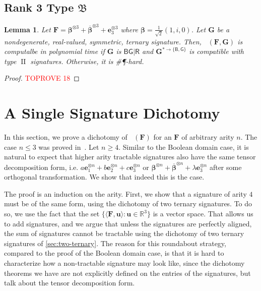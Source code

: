 \documentclass[11pt]{article}
\newtheorem{lemma}[theorem]{Lemma}
\DeclareMathOperator{\holts}{Holant^*_3}
\DeclareMathOperator{\typeii}{II}
\newcommand{\db}{\mathsf{B}}
\newcommand{\dg}{\mathsf{G}}
\newcommand{\dr}{\mathsf{R}}
\newcommand{\sph}{\#\P-hard\xspace}
\newcommand{\teh}{^{\otimes 3}}
\newcommand{\domres}[1]{
  ^{*\to\{#1\}}
}
\newcommand{\ternarytractz}{$\mathfrak{B}$\xspace}
\begin{document}
\subsection{Rank 3 Type \texorpdfstring{\ternarytractz}{B}}
\begin{lemma}\label{lem:dichotomy-terneray-ternary-rank-3-z}
  Let $\mathbf{F} = \boldsymbol{\beta} \teh + \overline{\boldsymbol{\beta}} \teh + \mathbf{e}_3 \teh$ where $\boldsymbol{\beta} = \frac{1}{\sqrt{2}} (1, i, 0)$.
  Let $\mathbf{G}$ be a nondegenerate, real-valued, symmetric, ternary signature.
  Then, $\holts(\mathbf{F}, \mathbf{G})$ is computalbe in polynomial time if $\mathbf{G}$ is $\db \dg | \dr$ and $\mathbf{G}\domres{\db, \dg}$ is compatible with type $\typeii$ signatures.
  Otherwise, it is \sph.
\end{lemma}
\begin{proof}\textcolor{red}{TOPROVE 18}\end{proof}
 
\section{A Single Signature Dichotomy}\label{sec:higher-arity}
In this section, we prove a dichotomy of $\holts(\mathbf{F})$ for an  
$\mathbf{F}$ of arbitrary arity $n$. The case $n\le 3$ was proved
in~\cite{cai_dichotomy_2013}. Let $n \ge 4$.
Similar to the Boolean domain case, it is natural to expect that higher arity tractable signatures also have the same tensor decomposition form, i.e. $a\mathbf{e}_1^{\otimes n} + b\mathbf{e}_2^{\otimes n} + c\mathbf{e}_3^{\otimes n}$ or $\boldsymbol{\beta}^{\otimes n} + \overline{\boldsymbol{\beta}}^{\otimes n} + \lambda \mathbf{e}_3^{\otimes n}$ after some orthogonal transformation.
We show that indeed this is the case.

The proof is an induction on the arity.
First, we show that a signature of arity $4$ must be of the same form, using the dichotomy of two ternary signatures.
To do so, we use the fact that the set $\{\langle \mathbf{F}, \mathbf{u} \rangle : \mathbf{u} \in \mathbb{R}^3\}$ is a vector space.
That allows us to add signatures, and we argue that unless the signatures are perfectly aligned, the sum of signatures cannot be tractable using the dichotomy of two ternary signatures of \cref{sec:two-ternary}.
The reason for this roundabout strategy, compared to the proof of the Boolean domain case, is that it is hard to characterize how a non-tractable signature may look like,
since the dichotomy theorems we have are not explicitly defined on the entries of the signatures, but talk about the tensor decomposition form.
\end{document}

